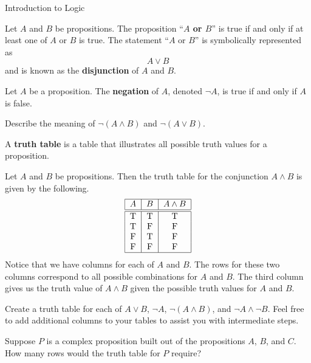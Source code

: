 \begin{section}{Introduction to Logic}
\begin{definition}
Let $A$ and $B$ be propositions.  The proposition ``\textbf{$A$ or $B$}'' is true if and only if at least one of $A$ or $B$ is true.  The statement ``$A$ or $B$'' is symbolically represented as
\[
A \vee B
\]
and is known as the \textbf{disjunction} of $A$ and $B$.
\end{definition}

\begin{definition}
Let $A$ be a proposition.  The \textbf{negation} of $A$, denoted $\neg A$, is true if and only if $A$ is false.
\end{definition}

\begin{exercise}Describe the meaning of $\neg (A \wedge B)$ and $\neg (A \vee B)$.
\end{exercise}

\begin{definition}
A \textbf{truth table} is a table that illustrates all possible truth values for a proposition.  
\end{definition}

\begin{example}
Let $A$ and $B$ be propositions.  Then the truth table for the conjunction $A\wedge B$ is given by the following.
\[
\begin{tabular}{| c | c  | c |} \hline
$A$  &  $B$ & $A \wedge B$  \\ \hline\hline
T & T & T  \\ 
T & F & F  \\ 
F & T & F  \\ 
F & F & F  \\ \hline
\end{tabular}
\]
Notice that we have columns for each of $A$ and $B$.  The rows for these two columns correspond to all possible combinations for $A$ and $B$.  The third column gives us the truth value of $A\wedge B$ given the possible truth values for $A$ and $B$.
\end{example}

\begin{exercise}
Create a truth table for each of $A \vee B$, $\neg A$, $\neg (A \wedge B)$, and $\neg A \wedge \neg B$.  Feel free to add additional columns to your tables to assist you with intermediate steps.
\end{exercise}

\begin{exercise}
Suppose $P$ is a complex proposition built out of the propositions $A$, $B$, and $C$.  How many rows would the truth table for $P$ require?
\end{exercise}


\end{section}
